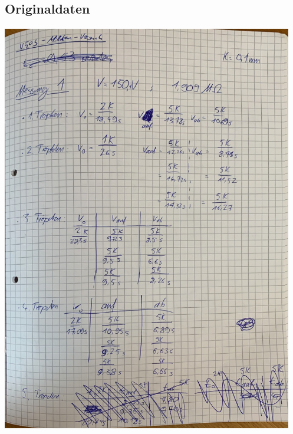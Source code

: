 \subsection{Originaldaten}
\centering
\includegraphics[height=18cm]{content/pics/originaldaten/Originaldaten_1.pdf}
\newpage
\centering
